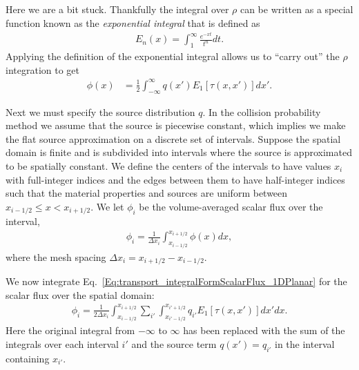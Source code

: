 Here we are a bit stuck. Thankfully the integral over $\rho$ can be written as a special function known as the \emph{exponential integral} that is defined as
\begin{align}
  E_n(x) = \int_1^\infty \frac{ e^{-xt} }{ t^n } dt .
\end{align}
Applying the definition of the exponential integral allows us to ``carry out'' the $\rho$ integration to get
\begin{align}
  \phi(x) &= \frac{1}{2} \int_{-\infty}^\infty q(x') E_1[ \tau(x,x') ]  dx'. \label{Eq:transport_integralFormScalarFlux_1DPlanar}
\end{align}

Next we must specify the source distribution $q$. In the collision probability method we assume that the source is piecewise constant, which implies we make the flat source approximation on a discrete set of intervals. Suppose the spatial domain is finite and is subdivided into intervals where the source is approximated to be spatially constant. We define the centers of the intervals to have values $x_i$ with full-integer indices and the edges between them to have half-integer indices such that the material properties and sources are uniform between $x_{i-1/2} \le x < x_{i+1/2}$. We let $\phi_i$ be the volume-averaged scalar flux over the interval,
\begin{align}
  \phi_i = \frac{1}{\Delta x_i} \int_{x_{i-1/2}}^{x_{i+1/2}} \phi(x) dx,
\end{align}
where the mesh spacing $\Delta x_i = x_{i+1/2} - x_{i-1/2}$. 

We now integrate Eq.~\eqref{Eq:transport_integralFormScalarFlux_1DPlanar} for the scalar flux over the spatial domain:
\begin{align}
  \phi_i = \frac{1}{2 \Delta x_i} \int_{x_{i-1/2}}^{x_{i+1/2}} \sum_{i'} \int_{x_{i'-1/2}}^{x_{i'+1/2}} q_{i'} E_1[ \tau(x,x') ]  dx' dx.
\end{align}
Here the original integral from $-\infty$ to $\infty$ has been replaced with the sum of the integrals over each interval $i'$ and the source term $q(x') = q_{i'}$ in the interval containing $x_{i'}$.

